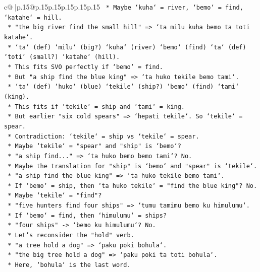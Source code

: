 \documentclass{article}
\begin{document}
{\begin{supertabular}{c@{$\;$}|p{.15\linewidth}@{}p{.15\linewidth}p{.15\linewidth}p{.15\linewidth}p{.15\linewidth}p{.15\linewidth}}
{{{\texttt{        *   Maybe `kuha` = river, `bemo` = find, `katahe` = hill.} \\
\texttt{    *   "the big river find the small hill" => `ta milu kuha bemo ta toti katahe`.} \\
\texttt{        *   `ta` (def) `milu` (big?) `kuha` (river) `bemo` (find) `ta` (def) `toti` (small?) `katahe` (hill).} \\
\texttt{        *   This fits SVO perfectly if `bemo` = find.} \\
\texttt{        *   But "a ship find the blue king" => `ta huko tekile bemo tami`.} \\
\texttt{            *   `ta` (def) `huko` (blue) `tekile` (ship?) `bemo` (find) `tami` (king).} \\
\texttt{            *   This fits if `tekile` = ship and `tami` = king.} \\
\texttt{            *   But earlier "six cold spears" => `hepati tekile`. So `tekile` = spear.} \\
\texttt{            *   Contradiction: `tekile` = ship vs `tekile` = spear.} \\
\texttt{            *   Maybe `tekile` = "spear" and "ship" is `bemo`?} \\
\texttt{            *   "a ship find..." => `ta huko bemo bemo tami`? No.} \\
\texttt{            *   Maybe the translation for "ship" is `bemo` and "spear" is `tekile`.} \\
\texttt{            *   "a ship find the blue king" => `ta huko tekile bemo tami`.} \\
\texttt{                *   If `bemo` = ship, then `ta huko tekile` = "find the blue king"? No.} \\
\texttt{                *   Maybe `tekile` = "find"?} \\
\texttt{                *   "five hunters find four ships" => `tumu tamimu bemo ku himulumu`.} \\
\texttt{                    *   If `bemo` = find, then `himulumu` = ships?} \\
\texttt{                    *   "four ships" {-}> `bemo ku himulumu`? No.} \\
\texttt{    *   Let's reconsider the "hold" verb.} \\
\texttt{        *   "a tree hold a dog" => `paku poki bohula`.} \\
\texttt{        *   "the big tree hold a dog" => `paku poki ta toti bohula`.} \\
\texttt{        *   Here, `bohula` is the last word.} \\
}}}
\end{supertabular}}
\end{document}
